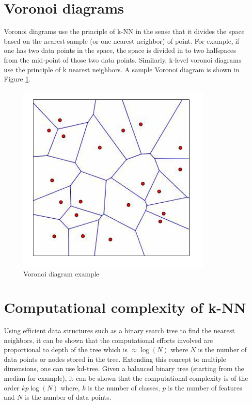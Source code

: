 \documentclass{article}
\begin{document}
\section{Voronoi diagrams}
Voronoi diagrams use the principle of k-NN in the sense that it divides the space based on the nearest sample (or one nearest neighbor) of point. For example, if one has two data points in the space, the space is divided in to two halfspaces from the mid-point of those two data points. Similarly, k-level voronoi diagrams use the principle of k nearest neighbors. A sample Voronoi diagram is shown in Figure \ref{Fig.2}.
\begin{figure}
\begin{center}
\includegraphics[scale=0.5]{voronoiExample.PNG}
\caption{Voronoi diagram example}
\label{Fig.2}
\end{center}
\end{figure}

\section{Computational complexity of k-NN}
Using efficient data structures such as a binary search tree to find the nearest neighbors, it can be shown that the computational efforts involved are proportional to depth of the tree which is $\approx \log(N)$ where $N$ is the number of data points or nodes stored in the tree. Extending this concept to multiple dimensions, one can use kd-tree. Given a balanced binary tree (starting from the median for example), it can be shown that the computational complexity is of the order $kp\log(N)$ where, $k$ is the number of classes, $p$ is the number of features and $N$ is the number of data points. 
\end{document}

